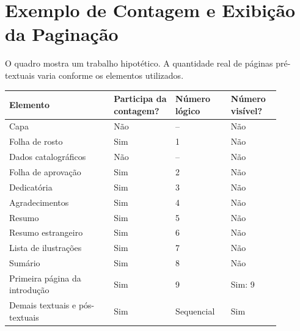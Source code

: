 \chapter{Exemplo de Contagem e Exibição da Paginação}
\label{ap:paginacao}

O quadro mostra um trabalho hipotético. A quantidade real de páginas pré-textuais varia conforme os elementos utilizados.

\begin{longtable}{p{0.34\linewidth}p{0.20\linewidth}p{0.18\linewidth}p{0.16\linewidth}}
\toprule
Elemento & Participa da contagem? & Número lógico & Número visível? \\
\midrule
Capa & Não & -- & Não \\
Folha de rosto & Sim & 1 & Não \\
Dados catalográficos & Não & -- & Não \\
Folha de aprovação & Sim & 2 & Não \\
Dedicatória & Sim & 3 & Não \\
Agradecimentos & Sim & 4 & Não \\
Resumo & Sim & 5 & Não \\
Resumo estrangeiro & Sim & 6 & Não \\
Lista de ilustrações & Sim & 7 & Não \\
Sumário & Sim & 8 & Não \\
Primeira página da introdução & Sim & 9 & Sim: 9 \\
Demais textuais e pós-textuais & Sim & Sequencial & Sim \\
\bottomrule
\end{longtable}

